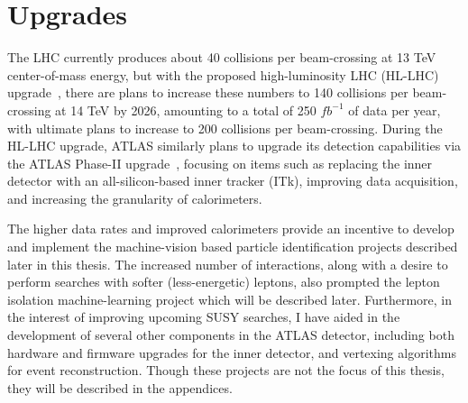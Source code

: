 \section{Upgrades}

The LHC currently produces about 40 collisions per beam-crossing at 13 TeV center-of-mass energy, but with the proposed high-luminosity LHC (HL-LHC) upgrade~\cite{HL_LHC}, there are plans to increase these numbers to 140 collisions per beam-crossing at 14 TeV by 2026, amounting to a total of 250 $fb^{-1}$ of data per year, with ultimate plans to increase to 200 collisions per beam-crossing. During the HL-LHC upgrade, ATLAS similarly plans to upgrade its detection capabilities via the ATLAS Phase-II upgrade~\cite{ATLAS_phaseII_TDR}, focusing on items such as replacing the inner detector with an all-silicon-based inner tracker (ITk), improving data acquisition, and increasing the granularity of calorimeters.

The higher data rates and improved calorimeters provide an incentive to develop and implement the machine-vision based particle identification projects described later in this thesis. The increased number of interactions, along with a desire to perform searches with softer (less-energetic) leptons, also prompted the lepton isolation machine-learning project which will be described later. Furthermore, in the interest of improving upcoming SUSY searches, I have aided in the development of several other components in the ATLAS detector, including both hardware and firmware upgrades for the inner detector, and vertexing algorithms for event reconstruction. Though these projects are not the focus of this thesis, they will be described in the appendices.